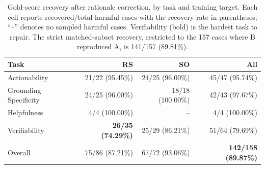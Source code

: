 \begin{table}[t]
\centering
\normalsize
\begin{tabular}{lrrr}
\toprule
Task & RS & SO & All \\
\midrule
Actionability           & 21/22 (95.45\%) & 24/25 (96.00\%) & 45/47 (95.74\%) \\
Grounding Specificity   & 24/25 (96.00\%) & 18/18 (100.00\%) & 42/43 (97.67\%) \\
Helpfulness             & 4/4 (100.00\%)  & --              & 4/4 (100.00\%) \\
Verifiability           & \textbf{26/35 (74.29\%)} & 25/29 (86.21\%) & 51/64 (79.69\%) \\
\midrule
Overall                 & 75/86 (87.21\%) & 67/72 (93.06\%) & \textbf{142/158 (89.87\%)} \\
\bottomrule
\end{tabular}
\caption{Gold-score recovery after rationale correction, by task and training target. Each cell reports recovered/total harmful cases with the recovery rate in parentheses; ``--'' denotes no sampled harmful cases. Verifiability (bold) is the hardest task to repair. The strict matched-subset recovery, restricted to the 157 cases where B reproduced A, is 141/157 (89.81\%).}
\label{tab:full-correction-task}
\end{table}

